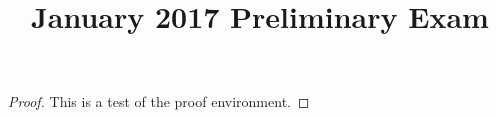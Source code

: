 \documentclass[11pt,twoside]{amsart}
\title{January 2017 Preliminary Exam}
\author{}
\theoremstyle{plain}
\begin{document}
\maketitle

\begin{proof}
    This is a test of the proof environment.
\end{proof}
\end{document}
